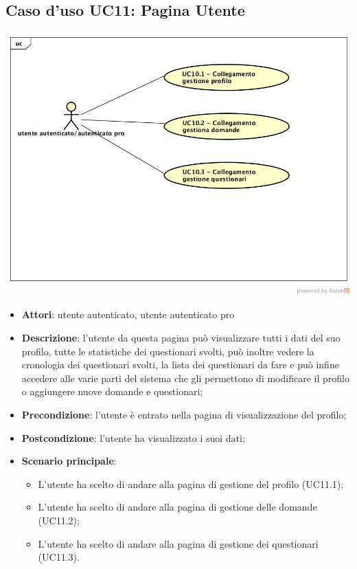 \subsection{Caso d'uso UC11: Pagina Utente}
\begin{center}
\includegraphics[scale=0.5]{UML/UC11.png}
\end{center}
\begin{itemize}
\item\textbf{Attori}: utente autenticato, utente autenticato pro
\item\textbf{Descrizione}: l'utente da questa pagina può visualizzare tutti i dati del suo profilo, tutte le statistiche dei questionari svolti, può inoltre vedere la cronologia dei questionari svolti, la lista dei questionari da fare e può infine accedere alle varie parti del sistema che gli permettono di modificare il profilo o aggiungere nuove domande e questionari;
\item\textbf{Precondizione}: l'utente è entrato nella pagina di visualizzazione del profilo;
\item\textbf{Postcondizione}: l'utente ha visualizzato i suoi dati;
\item\textbf{Scenario principale}:
\begin{itemize}
\item L'utente ha scelto di andare alla pagina di gestione del profilo (UC11.1);
\item L'utente ha scelto di andare alla pagina di gestione delle domande (UC11.2);  
\item L'utente ha scelto di andare alla pagina di gestione dei questionari (UC11.3).
\end{itemize}
\end{itemize}

